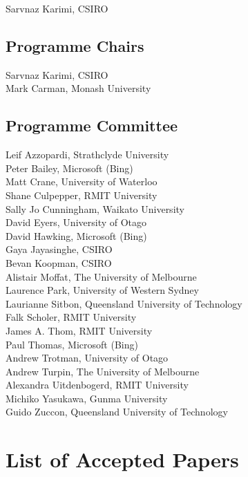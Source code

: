 \documentclass[a4paper]{article}
\begin{document}
Sarvnaz Karimi, CSIRO


\subsection*{Programme Chairs}

Sarvnaz Karimi, CSIRO\\
Mark Carman, Monash University

\subsection*{Programme Committee}
Leif Azzopardi, Strathclyde University\\
Peter Bailey, Microsoft (Bing)\\
Matt Crane, University of Waterloo \\
Shane Culpepper, RMIT University \\
Sally Jo Cunningham, Waikato University \\
David Eyers, University of Otago\\
David Hawking, Microsoft (Bing) \\
Gaya Jayasinghe, CSIRO\\
Bevan Koopman, CSIRO \\
Alistair Moffat, The University of Melbourne \\
Laurence Park, University of Western Sydney\\
Laurianne Sitbon, Queensland University of Technology\\
Falk Scholer, RMIT University \\
James A. Thom, RMIT University \\
Paul Thomas, Microsoft (Bing) \\
Andrew Trotman, University of Otago \\
Andrew Turpin, The University of Melbourne \\
Alexandra Uitdenbogerd, RMIT University\\
Michiko Yasukawa, Gunma University \\
Guido Zuccon, Queensland University of Technology

\newpage

\section*{List of Accepted Papers}
\end{document}
